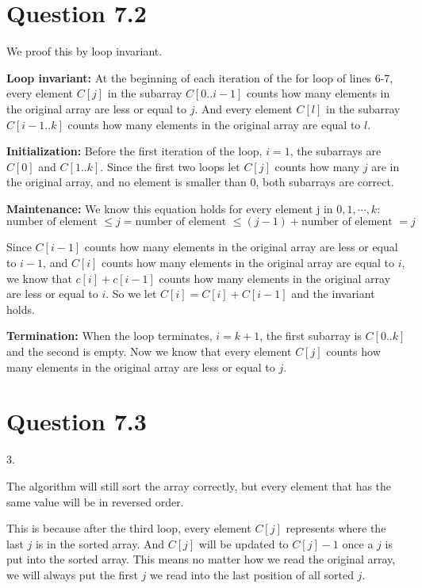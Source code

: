 \documentclass[a4paper,12pt]{article}
\begin{document}
\newpage
\section*{Question 7.2}

We proof this by loop invariant.

\textbf{Loop invariant:} 
At the beginning of each iteration of the for loop of lines 6-7, every element $C[j]$ in the subarray $C[0..i-1]$ counts how many elements in the original array are less or equal to $j$.
And every element $C[l]$ in the subarray $C[i-1..k]$ counts how many elements in the original array are equal to $l$.

\textbf{Initialization:}
Before the first iteration of the loop, $i = 1$, the subarrays are $C[0]$ and $C[1..k]$.
Since the first two loops let $C[j]$ counts how many $j$ are in the original array, and no element is smaller than 0, both subarrays are correct.

\textbf{Maintenance:}
We know this equation holds for every element j in $0,1, \cdots ,k$:
\begin{equation*}
	\text{number of element } \leq j = \text{number of element } \leq (j-1) + \text{number of element } = j
\end{equation*}

Since $C[i-1]$ counts how many elements in the original array are less or equal to $i-1$, and $C[i]$ counts how many elements in the original array are equal to $i$, we know that $c[i] + c[i-1]$ counts how many elements in the original array are less or equal to $i$.
So we let $C[i] = C[i] + C[i-1]$ and the invariant holds.

\textbf{Termination:}
When the loop terminates, $i = k+1$, the first subarray is $C[0..k]$ and the second is empty.
Now we know that every element $C[j]$ counts how many elements in the original array are less or equal to $j$.

\section*{Question 7.3}

3.

The algorithm will still sort the array correctly, but every element that has the same value will be in reversed order.

This is because after the third loop, every element $C[j]$ represents where the last $j$ is in the sorted array.
And $C[j]$ will be updated to $C[j]-1$ once a $j$ is put into the sorted array.
This means no matter how we read the original array, we will always put the first $j$ we read into the last position of all sorted $j$.
\end{document}

